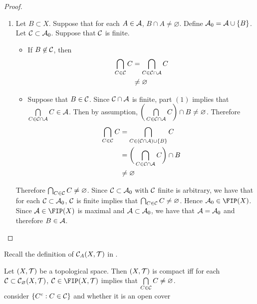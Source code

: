 \documentclass{book}
\begin{document}
\begin{proof}
\begin{enumerate}
			\item Let $B \subset X$. Suppose that for each $A \in \mathcal{A}$, $B \cap A \neq \varnothing$. Define $\mathcal{A}_0 = \mathcal{A} \cup \{B\}$. Let $\mathcal{C} \subset \mathcal{A}_0$. Suppose that $\mathcal{C}$ is finite. 
			\begin{itemize}
				\item If $B \not \in \mathcal{C}$, then 
				\begin{align*}
					\bigcap_{C \in \mathcal{C}} C
					& = \bigcap_{C \in \mathcal{C} \cap \mathcal{A}} C \\
					& \neq \varnothing
				\end{align*} 
				\item Suppose that $B \in \mathcal{C}$. Since $\mathcal{C} \cap \mathcal{A}$ is finite, part $(1)$ implies that $\bigcap\limits_{C \in \mathcal{C} \cap \mathcal{A}} C \in \mathcal{A}$. Then by assumption, $\bigg( \bigcap\limits_{C \in \mathcal{C} \cap \mathcal{A}} C \bigg) \cap B \neq \varnothing$.  Therefore 
				\begin{align*}
					\bigcap_{C \in \mathcal{C}} C
					& = \bigcap_{C \in (\mathcal{C} \cap \mathcal{A}) \cup \{B\}} C \\
					& = \bigg( \bigcap_{C \in \mathcal{C} \cap \mathcal{A}} C \bigg) \cap B \\
					& \neq \varnothing
				\end{align*}  
			\end{itemize}
			Therefore $\bigcap_{C \in \mathcal{C}} C \neq \varnothing$. Since $\mathcal{C} \subset \mathcal{A}_0$ with $\mathcal{C}$ finite is arbitrary, we have that for each $\mathcal{C} \subset \mathcal{A}_0$, $\mathcal{C}$ is finite implies that $\bigcap_{C \in \mathcal{C}} C \neq \varnothing$. Hence $\MA_0 \in \FIP(X)$. Since $\MA \in \FIP(X)$ is maximal and $\mathcal{A} \subset \mathcal{A}_0$, we have that $\mathcal{A} = \mathcal{A}_0$ and therefore $B \in \mathcal{A}$. 
		\end{enumerate}
	\end{proof}
	
	\begin{note}
		Recall the definition of $\mathcal{C}_A(X, \mathcal{T})$ in .
	\end{note}
	
	\begin{ex} 
		Let $(X, \mathcal{T})$ be a topological space. Then $(X, \mathcal{T})$ is compact iff for each $\mathcal{C} \subset \mathcal{C}_\varnothing(X, \mathcal{T})$, $\MC \in \FIP(X, \MT)$ implies that $\bigcap\limits_{C \in \mathcal{C}} C \neq \varnothing$. \\
		 consider $\{C^c: C \in \mathcal{C}\}$ and whether it is an open cover
	\end{ex}
\end{document}
